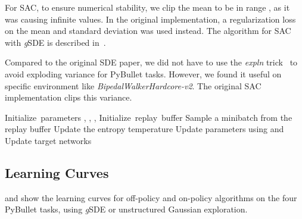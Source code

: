 \documentclass{article}
\newcommand{\SDE}{\textsc{SDE}\xspace}
\newcommand{\ourSDE}{\textit{g}\textsc{SDE}\xspace}
\newcommand{\sac}{\textsc{SAC}\xspace}
\begin{document}
For \sac, to ensure numerical stability, we clip the mean to be in range , as it was causing infinite values. In the original implementation, a regularization  loss on the mean and standard deviation was used instead. The algorithm for \sac with \ourSDE is described in~.

Compared to the original \SDE paper, we did not have to use the \textit{expln} trick~\citep{ruckstiess2008state} to avoid exploding variance for PyBullet tasks. However, we found it useful on specific environment like \textit{BipedalWalkerHardcore-v2}. The original \sac implementation clips this variance.


\begin{algorithm}[h]
\caption{Soft Actor-Critic with \ourSDE}
\label{algo:sac-sde}
\begin{algorithmic}
\State \mbox{Initialize parameters} , , , 
\State \mbox{Initialize replay buffer} 
  \State  {}
  	\State   {}
  	\State  {}
  	\State 
	\EndFor
    \State  {}
    \State Sample a minibatch from the replay buffer 
    \State Update the entropy temperature 
    \State Update parameters using  and 
    \State Update target networks
	\EndFor
\EndFor
\end{algorithmic}
\end{algorithm}


\subsection{Learning Curves}
\label{sec:learning-curves}

 and  show the learning curves for off-policy and on-policy algorithms on the four PyBullet tasks, using \ourSDE or unstructured Gaussian exploration.
\end{document}
